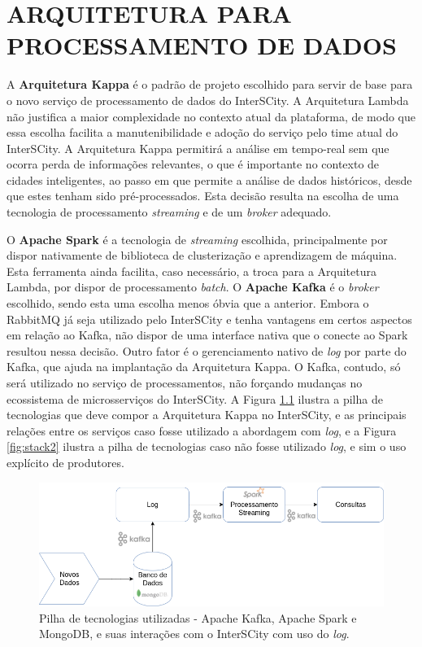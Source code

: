 \chapter[ARQUITETURA PARA PROCESSAMENTO DE DADOS]{ARQUITETURA PARA PROCESSAMENTO DE DADOS}
\label{chapter:architecture}

A \textbf{Arquitetura Kappa} é o padrão de projeto escolhido para servir de
base para o novo serviço de processamento de dados do InterSCity. A Arquitetura
Lambda não justifica a maior complexidade no contexto atual da plataforma, de
modo que essa escolha facilita a manutenibilidade e adoção do serviço pelo
time atual do InterSCity. A Arquitetura Kappa permitirá a análise em tempo-real
sem que ocorra perda de informações relevantes, o que é importante no contexto de
cidades inteligentes, ao passo em que permite a análise de dados históricos,
desde que estes tenham sido pré-processados. Esta decisão resulta na escolha de
uma tecnologia de processamento \textit{streaming} e de um
\textit{broker} adequado.

O \textbf{Apache Spark} é a tecnologia de \textit{streaming} escolhida,
principalmente por dispor nativamente de biblioteca de clusterização e
aprendizagem de máquina. Esta ferramenta ainda facilita, caso necessário, a
troca para a Arquitetura Lambda, por dispor de processamento \textit{batch}.
O \textbf{Apache Kafka} é o \textit{broker} escolhido, sendo esta uma escolha
menos óbvia que a anterior. Embora o RabbitMQ já seja utilizado pelo
InterSCity e tenha vantagens em certos aspectos em relação ao Kafka, não
dispor de uma interface nativa que o conecte ao Spark resultou nessa decisão.
Outro fator é o gerenciamento nativo de \textit{log} por parte do
Kafka, que ajuda na implantação da Arquitetura Kappa. O Kafka, contudo, só
será utilizado no serviço de processamentos, não forçando mudanças no
ecossistema de microsserviços do InterSCity. A Figura \ref{fig:stack} ilustra
a pilha de tecnologias que deve compor a Arquitetura Kappa no InterSCity, e
as principais relações entre os serviços caso fosse utilizado a abordagem com
\textit{log}, e a Figura \ref{fig:stack2} ilustra a pilha de tecnologias caso
não fosse utilizado \textit{log}, e sim o uso explícito de produtores.

\begin{figure}
  \centering
    \includegraphics[scale=0.5]{figuras/kappa_tools.png}
  \caption{Pilha de tecnologias utilizadas - Apache Kafka, Apache Spark e
    MongoDB, e suas interações com o InterSCity com uso do \textit{log}.}
  \label{fig:stack}
\end{figure}

